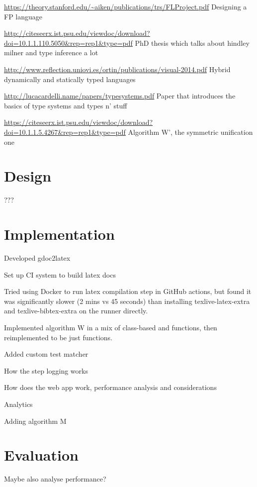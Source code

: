 \documentclass[a4paper,fleqn,12pt]{article}
\begin{document}
\underline{\href{https://theory.stanford.edu/\textasciitilde aiken/publications/trs/FLProject.pdf}{https://theory.stanford.edu/\textasciitilde aiken/publications/trs/FLProject.pdf}}
Designing a FP language

\underline{\href{http://citeseerx.ist.psu.edu/viewdoc/download?doi=10.1.1.110.5050\&rep=rep1\&type=pdf}{http://citeseerx.ist.psu.edu/viewdoc/download?doi=10.1.1.110.5050\&rep=rep1\&type=pdf}}
PhD thesis which talks about hindley milner and type inference a lot

\underline{\href{http://www.reflection.uniovi.es/ortin/publications/visual-2014.pdf}{http://www.reflection.uniovi.es/ortin/publications/visual-2014.pdf}}
Hybrid dynamically and statically typed languages

\underline{\href{http://lucacardelli.name/papers/typesystems.pdf}{http://lucacardelli.name/papers/typesystems.pdf}}
Paper that introduces the basics of type systems and types n’ stuff

\underline{\href{https://citeseerx.ist.psu.edu/viewdoc/download?doi=10.1.1.5.4267\&rep=rep1\&type=pdf}{https://citeseerx.ist.psu.edu/viewdoc/download?doi=10.1.1.5.4267\&rep=rep1\&type=pdf}}
Algorithm W’, the symmetric unification one

\section{Design}\label{id:h.7ggvdxb04tzm}
???
\section{Implementation}\label{id:h.igepudpadp49}
Developed gdoc2latex

Set up CI system to build latex docs

Tried using Docker to run latex compilation step in GitHub actions, but found it was significantly slower (2 mins vs 45 seconds) than installing texlive-latex-extra and texlive-bibtex-extra on the runner directly.

Implemented algorithm W in a mix of class-based and functions, then reimplemented to be just functions.

Added custom test matcher

How the step logging works

How does the web app work, performance analysis and considerations

Analytics

Adding algorithm M
\section{Evaluation}\label{id:h.e6letww4nhn0}
Maybe also analyse performance?
\end{document}
